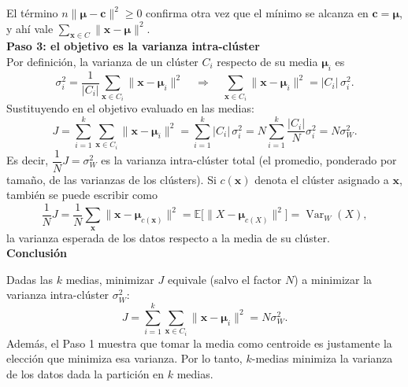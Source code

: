 El término $n \| \boldsymbol{\mu} - \mathbf{c} \|^2 \geq 0$ confirma otra vez que el mínimo se alcanza en $\mathbf{c} = \boldsymbol{\mu}$, y ahí vale $\sum_{\mathbf{x} \in C} \| \mathbf{x} - \boldsymbol{\mu} \|^2$.\\

\textbf{Paso 3: el objetivo es la varianza intra-clúster}\\

Por definición, la varianza de un clúster $C_i$ respecto de su media $\boldsymbol{\mu}_i$ es
\[
    \sigma_i^2 = \frac{1}{|C_i|} \sum_{\mathbf{x} \in C_i} \| \mathbf{x} - \boldsymbol{\mu}_i \|^2
    \quad \Longrightarrow \quad
    \sum_{\mathbf{x} \in C_i} \| \mathbf{x} - \boldsymbol{\mu}_i \|^2 = |C_i| \, \sigma_i^2.
\]
Sustituyendo en el objetivo evaluado en las medias:
\[
    J = \sum_{i=1}^{k} \sum_{\mathbf{x} \in C_i} \| \mathbf{x} - \boldsymbol{\mu}_i \|^2 = \sum_{i=1}^{k} |C_i| \, \sigma_i^2 = N \sum_{i=1}^{k} \frac{|C_i|}{N} \sigma_i^2 = N \sigma_W^2.
\]
Es decir, $\dfrac{1}{N} J = \sigma_W^2$ es la varianza intra-clúster total (el promedio, ponderado por tamaño, de las varianzas de los clústers). Si $c(\mathbf{x})$ denota el clúster asignado a $\mathbf{x}$, también se puede escribir como
\[
    \frac{1}{N} J = \frac{1}{N} \sum_{\mathbf{x}} \| \mathbf{x} - \boldsymbol{\mu}_{c(\mathbf{x})} \|^2 = \mathbb{E} \big[ \| X - \boldsymbol{\mu}_{c(X)} \|^2 \big] = \operatorname{Var}_W(X),
\]
la varianza esperada de los datos respecto a la media de su clúster.\\

\textbf{Conclusión}

Dadas las $k$ medias, minimizar $J$ equivale (salvo el factor $N$) a minimizar la varianza intra-clúster $\sigma_W^2$:
\[
    J = \sum_{i=1}^{k} \sum_{\mathbf{x} \in C_i} \| \mathbf{x} - \boldsymbol{\mu}_i \|^2 = N \sigma_W^2.
\]
Además, el Paso 1 muestra que tomar la media como centroide es justamente la elección que minimiza esa varianza. Por lo tanto, $k$-medias minimiza la varianza de los datos dada la partición en $k$ medias.
